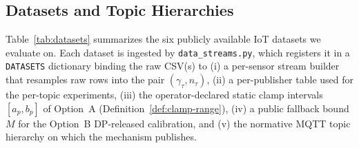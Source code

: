 \subsection{Datasets and Topic Hierarchies}
\label{sec:datasets}

Table~\ref{tab:datasets} summarizes the six publicly available IoT datasets we evaluate on. Each dataset is ingested by \texttt{data\_streams.py}, which registers it in a \texttt{DATASETS} dictionary binding the raw CSV(s) to (i) a per-sensor stream builder that resamples raw rows into the pair $(\gamma_\tau, n_\tau)$, (ii) a per-publisher table used for the per-topic experiments, (iii) the operator-declared static clamp intervals $[a_p, b_p]$ of Option~A (Definition~\ref{def:clamp-range}), (iv) a public fallback bound $M$ for the Option~B DP-released calibration, and (v) the normative MQTT topic hierarchy on which the mechanism publishes.

